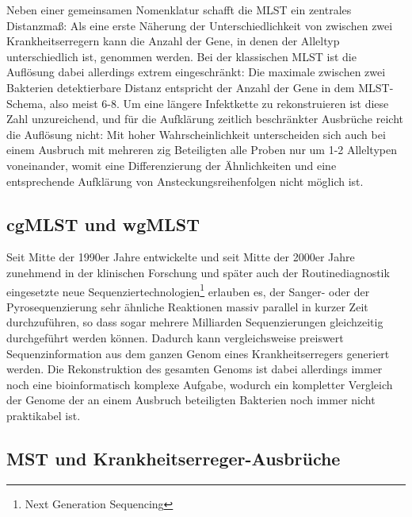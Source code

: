 Neben einer gemeinsamen Nomenklatur schafft die MLST ein zentrales Distanzmaß: Als eine erste Näherung der Unterschiedlichkeit von zwischen zwei Krankheitserregern kann die Anzahl der Gene, in denen der Alleltyp unterschiedlich ist, genommen werden. Bei der klassischen MLST ist die Auflösung dabei allerdings extrem eingeschränkt: Die maximale zwischen zwei Bakterien detektierbare Distanz entspricht der Anzahl der Gene in dem MLST-Schema, also meist 6-8. Um eine längere Infektkette zu rekonstruieren ist diese Zahl unzureichend, und für die Aufklärung zeitlich beschränkter Ausbrüche reicht die Auflösung nicht: Mit hoher Wahrscheinlichkeit unterscheiden sich auch bei einem Ausbruch mit mehreren zig Beteiligten alle Proben nur um 1-2 Alleltypen voneinander, womit eine Differenzierung der Ähnlichkeiten und eine entsprechende Aufklärung von Ansteckungsreihenfolgen nicht möglich ist.  

\subsection{cgMLST und wgMLST}

Seit Mitte der 1990er Jahre entwickelte und seit Mitte der 2000er Jahre zunehmend in der klinischen Forschung und später auch der Routinediagnostik eingesetzte neue Sequenziertechnologien\footnote{Next Generation Sequencing} erlauben es, der Sanger- oder der Pyrosequenzierung sehr ähnliche Reaktionen massiv parallel in kurzer Zeit durchzuführen, so dass sogar mehrere Milliarden Sequenzierungen gleichzeitig durchgeführt werden können. Dadurch kann vergleichsweise preiswert Sequenzinformation aus dem ganzen Genom eines Krankheitserregers generiert werden. Die Rekonstruktion des gesamten Genoms ist dabei allerdings immer noch eine bioinformatisch komplexe Aufgabe, wodurch ein kompletter Vergleich der Genome der an einem Ausbruch beteiligten Bakterien noch immer nicht praktikabel ist. 

\subsection{MST und Krankheitserreger-Ausbrüche}
